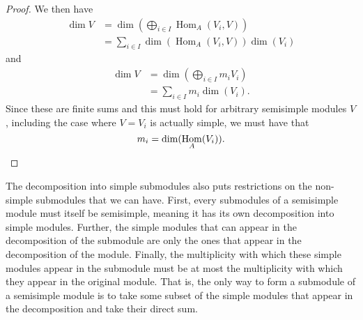 \documentclass[fleqn]{NotesClass}
\DeclareMathOperator{\Hom}{Hom}
\begin{document}
\begin{lma}{}{}
\begin{proof}
            We then have
            \begin{align}
                \dim V &= \dim\left( {\textstyle \bigoplus_{i \in I}} \Hom_A(V_i, V) \right)\\
                &= {\textstyle \sum_{i \in I}} \dim(\Hom_A(V_i, V)) \dim(V_i)
            \end{align}
            and
            \begin{align}
                \dim V &= \dim\left( {\textstyle \bigoplus_{i \in I}} m_i V_i \right)\\
                &= {\textstyle \sum_{i \in I}} m_i \dim (V_i).
            \end{align}
            Since these are finite sums and this must hold for arbitrary semisimple modules \(V\), including the case where \(V = V_i\) is actually simple, we must have that
            \begin{equation*}
                m_i = \dim(\Hom_A(V_i)). \qedhere
            \end{equation*}
        \end{proof}
    \end{lma}
    
    The decomposition into simple submodules also puts restrictions on the non-simple submodules that we can have.
    First, every submodules of a semisimple module must itself be semisimple, meaning it has its own decomposition into simple modules.
    Further, the simple modules that can appear in the decomposition of the submodule are only the ones that appear in the decomposition of the module.
    Finally, the multiplicity with which these simple modules appear in the submodule must be at most the multiplicity with which they appear in the original module.
    That is, the only way to form a submodule of a semisimple module is to take some subset of the simple modules that appear in the decomposition and take their direct sum.
    
\end{document}
